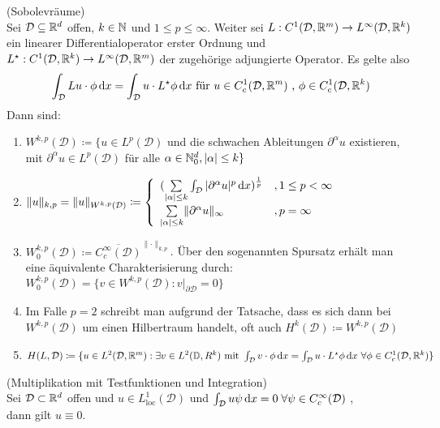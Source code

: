 \begin{Definition}(Sobolevräume)\\
	Sei $\mathcal{D} \subseteq \mathbb{R}^d $ offen, $ k \in \mathbb{N} $ und $ 1 \leq p \leq \infty $.  Weiter sei $ L : C^1(\mathcal{D},\mathbb{R}^m) \to L^{\infty}(\mathcal{D},\mathbb{R}^k) $ ein linearer Differentialoperator erster Ordnung und $ L^{\star} : C^1(\mathcal{D},\mathbb{R}^k) \to L^{\infty}(\mathcal{D},\mathbb{R}^m) $ der zugehörige adjungierte Operator. Es gelte also
	\[
	\int_{\mathcal{D}} Lu \cdot \phi \, \mathrm{d} x = \int_{\mathcal{D}} u \cdot L^{\star} \phi \, \mathrm{d} x \text{ für } u \in C^1_c(\mathcal{D},\mathbb{R}^m) \text{ , } \phi \in C^1_c (\mathcal{D},\mathbb{R}^k)
	\]
	Dann sind:
	\begin{enumerate}[label=(\alph*)]
		\item $ W^{k,p} (\mathcal{D}) \coloneqq \{ u \in L^p(\mathcal{D})$ und die schwachen Ableitungen $ \partial^{\alpha}u $ existieren, mit $ \partial^{\alpha}u \in L^p(\mathcal{D}) $ für alle $ \alpha \in \mathbb{N}_0^d , |\alpha| \leq k \} $	
		\item $ \lVert u \rVert_{k,p} =  \lVert u \rVert_{W^{k,p}(\mathcal{D})} \coloneqq 
				\begin{cases}
					\begin{array}{lll}
						(\sum\limits_{|\alpha|\leq k} \int_{\mathcal{D}} |\partial^{\alpha} u |^p \, \mathrm{d} x)^{\frac{1}{p}} &, 1 \leq p < \infty \\
						\sum\limits_{|\alpha|\leq k}   \lVert \partial^{\alpha} u \rVert_{\infty}        &, p = \infty
					\end{array}
				\end{cases}  $
		\item $ W_0^{k,p}(\mathcal{D}) \coloneqq \overline{ C_c^{\infty}(\mathcal{D}) }^{\lVert \cdot \rVert_{k,p}} $. Über den sogenannten Spursatz erhält man eine äquivalente Charakterisierung durch: 
		$ W_0^{k,p}(\mathcal{D}) = \{ v \in W^{k,p}(\mathcal{D}) : v|_{\partial \mathcal{D}} = 0 \}$
		\item Im Falle $ p = 2 $ schreibt man aufgrund der Tatsache, dass es sich dann bei $ W^{k,p}(\mathcal{D}) $ um einen Hilbertraum handelt, oft auch $ H^k(\mathcal{D}) \coloneqq W^{k,p}(\mathcal{D}) $
		\item $ H(L,\mathcal{D}) \coloneqq \{ u \in L^2(\mathcal{D},\mathbb{R}^m) : \exists v \in L^2(\mathbb{D},R^k) \text{ mit } \int_{\mathcal{D}} v \cdot \phi \, \mathrm{d} x = \int_{\mathcal{D}} u \cdot L^{\star}\phi \, \mathrm{d} x \ \forall \phi \in C^1_c(\mathcal{D},\mathbb{R}^k) \}$
	\end{enumerate}
\end{Definition}

\begin{Satz}(Multiplikation mit Testfunktionen und Integration) \\ 
	\label{testfunktionen}
	Sei $\mathcal{D} \subset \mathbb{R}^d$ offen und $u \in L_{\text{loc}}^1(\mathcal{D})$ und $\int_{\mathcal{D}} u \psi \, \mathrm{d} x = 0 \; \forall \psi \in C_c^{\infty}(\mathcal{D})$ ,\\
	dann gilt $ u \equiv 0 $.
\end{Satz}
